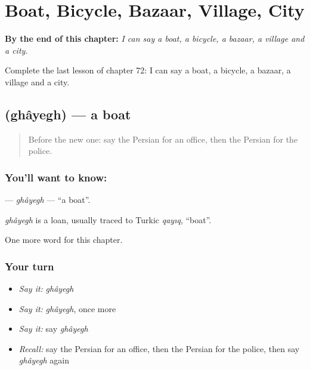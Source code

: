 
\chapter{Boat, Bicycle, Bazaar, Village, City}
\label{ch:fa-boat-bicycle-bazaar-village-city}

\begin{chapteropening}
\textbf{By the end of this chapter:} \emph{I can say a boat, a bicycle, a bazaar, a village and a city.}

Complete the last lesson of chapter 72: I can say a boat, a bicycle, a bazaar, a village and a city.
\end{chapteropening}

\section[\texorpdfstring{\fa{قایق} (ghâyegh)}{قایق (ghâyegh)}]{ (ghâyegh) — a boat}

\label{lesson:FA-C72-ghayegh}



\begin{quote}
Before the new one: say the Persian for an office, then the Persian for the police.
\end{quote}

\subsection*{You'll want to know: }
\textbf{} — \emph{ghâyegh} — \textquotedblleft{}a boat\textquotedblright{}.

\begin{cousinweb}
\emph{ghâyegh} is a loan, usually traced to Turkic \emph{qayıq}, \textquotedblleft{}boat\textquotedblright{}.
\end{cousinweb}

\begin{grammarlens}[title={What you've built}]
One more word for this chapter.
\end{grammarlens}

\subsection*{Your turn}
\begin{itemize}
\raggedright
  \item \emph{Say it:} \emph{ghâyegh}
  \item \emph{Say it:} \emph{ghâyegh}, once more
  \item \emph{Say it:} say \emph{ghâyegh}
  \item \emph{Recall:} say the Persian for an office, then the Persian for the police, then say \emph{ghâyegh} again
\end{itemize}

